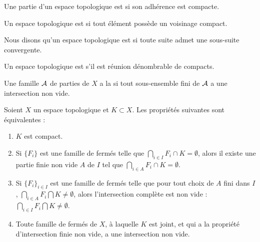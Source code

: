 \begin{definition}
    Une partie d'un espace topologique est  si son adhérence est compacte.
\end{definition}

\begin{definition}  \label{DefEIBYooAWoESf}
    Un espace topologique est  si tout élément possède un voisinage compact.
\end{definition}

\begin{definition} \label{DefEspaceSeqCompact}
    Nous disons qu'un espace topologique est  si toute suite admet une sous-suite convergente.
\end{definition}

\begin{definition}      \label{DefFCGBooLpnSAK}
    Un espace topologique est  s'il est réunion dénombrable de compacts.
\end{definition}

\begin{definition}
    Une famille \( \mathcal{A}\) de parties de \( X\) a la  si tout sous-ensemble fini de \( \mathcal{A}\) a une intersection non vide.
\end{definition}

\begin{proposition}\label{PropXKUMiCj}
    Soient \( X\) un espace topologique et \( K\subset X\). Les propriétés suivantes sont équivalentes :
    \begin{enumerate}
        \item\label{ItemXYmGHFai}
            \( K\) est compact.
        \item\label{ItemXYmGHFaii}
            Si \( \{ F_i \}\) est une famille de fermés telle que \( \bigcap_{i\in I}F_i \cap K =\emptyset\), alors il existe une partie finie non vide \( A\) de \( I\) tel que \( \bigcap_{i\in A}F_i \cap K =\emptyset\).
        \item\label{ItemXYmGHFaiii}
            Si \( \{ F_i \}_{i\in I}\) est une famille de fermés telle que pour tout choix de \( A\) fini dans \( I\), \( \bigcap_{i\in A}F_i \bigcap K \neq\emptyset\), alors l'intersection complète est non vide : \( \bigcap_{i\in I}F_i \bigcap K\neq\emptyset\).
        \item\label{ItemXYmGHFaiv}
            Toute famille de fermés de \( X \), à laquelle \( K \) est joint, et qui a la propriété d'intersection finie non vide, a une intersection non vide.
    \end{enumerate}
\end{proposition}

